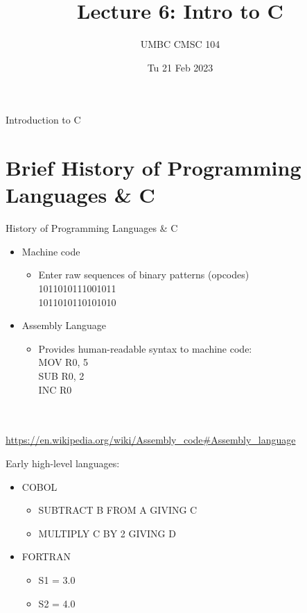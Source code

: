 \documentclass[graphics]{beamer}
\title{Lecture 6: Intro to C}
\author{UMBC CMSC 104}
\date{Tu 21 Feb 2023}
\begin{document}
\begin{frame}{}
\centering
    Introduction to C
\end{frame}

\frame{\tableofcontents}

\section{Brief History of Programming Languages \& C}
\begin{frame}{History of Programming Languages \& C}
     {
        \begin{itemize}
            \item Machine code
            \begin{itemize}
                \item Enter raw sequences of binary patterns (opcodes) \\
                1011010111001011 \\
                1011010110101010
            \end{itemize}
            \item Assembly Language
            \begin{itemize}
                \item Provides human-readable syntax to machine code: \\
                MOV R0, 5 \\
                SUB R0, 2 \\
                INC R0
            \end{itemize}
        \end{itemize}
        \\ ~~ \\
        \footnotesize{\url{https://en.wikipedia.org/wiki/Assembly_code\#Assembly_language}}
    }
     {
        Early high-level languages:
        \begin{itemize}
            \item COBOL
            \begin{itemize}
                \item SUBTRACT B FROM A GIVING C
                \item MULTIPLY C BY 2 GIVING D
            \end{itemize}
            \item FORTRAN
            \begin{itemize}
                \item S1 = 3.0
                \item S2 = 4.0

\end{itemize}
\end{itemize}}
\end{frame}
\end{document}

